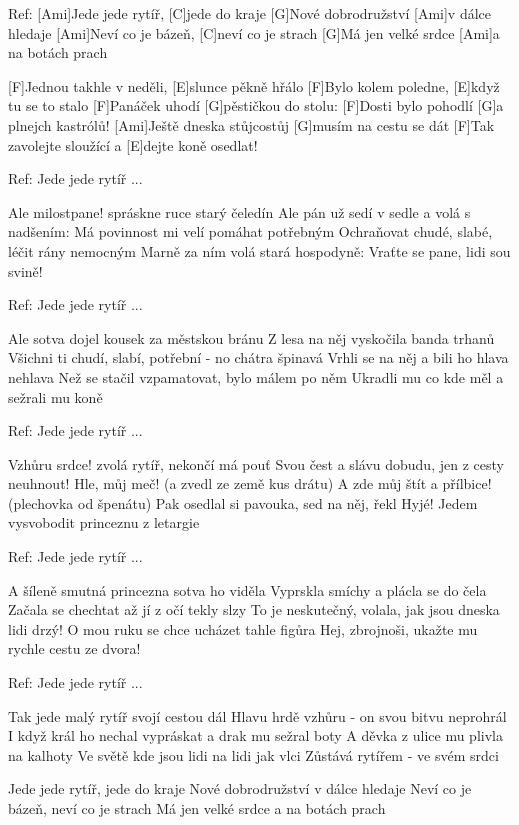 
Ref: [Ami]Jede jede rytíř, [C]jede do kraje 
[G]Nové dobrodružství [Ami]v dálce hledaje 
[Ami]Neví co je bázeň, [C]neví co je strach 
[G]Má jen velké srdce [Ami]a na botách prach 

[F]Jednou takhle v neděli, [E]slunce pěkně hřálo 
[F]Bylo kolem poledne, [E]když tu se to stalo 
[F]Panáček uhodí [G]pěstičkou do stolu: 
[F]Dosti bylo pohodlí [G]a plnejch kastrólů! 
[Ami]Ještě dneska stůjcostůj [G]musím na cestu se dát 
[F]Tak zavolejte sloužící a [E]dejte koně osedlat! 

Ref: Jede jede rytíř ...

Ale milostpane! spráskne ruce starý čeledín 
Ale pán už sedí v sedle a volá s nadšením: 
Má povinnost mi velí pomáhat potřebným 
Ochraňovat chudé, slabé, léčit rány nemocným 
Marně za ním volá stará hospodyně: 
Vraťte se pane, lidi sou svině! 

Ref: Jede jede rytíř ...
\slpc

Ale sotva dojel kousek za městskou bránu 
Z lesa na něj vyskočila banda trhanů 
Všichni ti chudí, slabí, potřební - no chátra špinavá 
Vrhli se na něj a bili ho hlava nehlava 
Než se stačil vzpamatovat, bylo málem po něm 
Ukradli mu co kde měl a sežrali mu koně 

Ref: Jede jede rytíř ...


Vzhůru srdce! zvolá rytíř, nekončí má pouť 
Svou čest a slávu dobudu, jen z cesty neuhnout! 
Hle, můj meč! (a zvedl ze země kus drátu) 
A zde můj štít a přílbice! (plechovka od špenátu) 
Pak osedlal si pavouka, sed na něj, řekl Hyjé! 
Jedem vysvobodit princeznu z letargie 

Ref: Jede jede rytíř ...

A šíleně smutná princezna sotva ho viděla 
Vyprskla smíchy a plácla se do čela 
Začala se chechtat až jí z očí tekly slzy 
To je neskutečný, volala, jak jsou dneska lidi drzý! 
O mou ruku se chce ucházet tahle figůra 
Hej, zbrojnoši, ukažte mu rychle cestu ze dvora! 

Ref: Jede jede rytíř ...

Tak jede malý rytíř svojí cestou dál 
Hlavu hrdě vzhůru - on svou bitvu neprohrál 
I když král ho nechal vypráskat a drak mu sežral boty 
A děvka z ulice mu plivla na kalhoty 
Ve světě kde jsou lidi na lidi jak vlci 
Zůstává rytířem - ve svém srdci 

Jede jede rytíř, jede do kraje 
Nové dobrodružství v dálce hledaje 
Neví co je bázeň, neví co je strach 
Má jen velké srdce a na botách prach 



